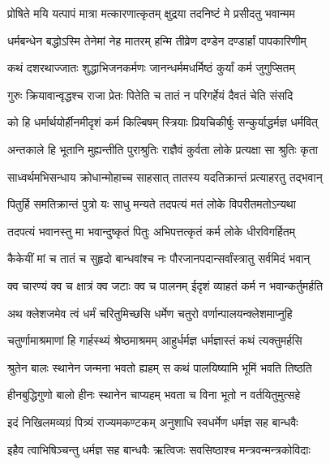 \twolineshloka
{प्रोषिते मयि यत्पापं मात्रा मत्कारणात्कृतम्}
{क्षुद्रया तदनिष्टं मे प्रसीदतु भवान्मम} %

\twolineshloka
{धर्मबन्धेन बद्धोऽस्मि तेनेमां नेह मातरम्}
{हन्मि तीव्रेण दण्डेन दण्डार्हां पापकारिणीम्} %

\twolineshloka
{कथं दशरथाज्जातः शुद्धाभिजनकर्मणः}
{जानन्धर्ममधर्मिष्ठं कुर्यां कर्म जुगुप्सितम्} %

\twolineshloka
{गुरुः क्रियावान्वृद्धश्च राजा प्रेतः पितेति च}
{तातं न परिगर्हेयं दैवतं चेति संसदि} %

\twolineshloka
{को हि धर्मार्थयोर्हीनमीदृशं कर्म किल्बिषम्}
{स्त्रियाः प्रियचिकीर्षुः सन्कुर्याद्धर्मज्ञ धर्मवित्} %

\twolineshloka
{अन्तकाले हि भूतानि मुह्यन्तीति पुराश्रुतिः}
{राज्ञैवं कुर्वता लोके प्रत्यक्षा सा श्रुतिः कृता} %

\twolineshloka
{साध्वर्थमभिसन्धाय क्रोधान्मोहाच्च साहसात्}
{तातस्य यदतिक्रान्तं प्रत्याहरतु तद्भवान्} %

\twolineshloka
{पितुर्हि समतिक्रान्तं पुत्रो यः साधु मन्यते}
{तदपत्यं मतं लोके विपरीतमतोऽन्यथा} %

\twolineshloka
{तदपत्यं भवानस्तु मा भवान्दुष्कृतं पितुः}
{अभिपत्तत्कृतं कर्म लोके धीरविगर्हितम्} %

\twolineshloka
{कैकेयीं मां च तातं च सुहृदो बान्धवांश्च नः}
{पौरजानपदान्सर्वांस्त्रातु सर्वमिदं भवान्} %

\twolineshloka
{क्व चारण्यं क्व च क्षात्रं क्व जटाः क्व च पालनम्}
{ईदृशं व्याहतं कर्म न भवान्कर्तुमर्हति} %

\twolineshloka
{अथ क्लेशजमेव त्वं धर्मं चरितुमिच्छसि}
{धर्मेण चतुरो वर्णान्पालयन्क्लेशमाप्नुहि} %

\twolineshloka
{चतुर्णामाश्रमाणां हि गार्हस्थ्यं श्रेष्ठमाश्रमम्}
{आहुर्धर्मज्ञ धर्मज्ञास्तं कथं त्यक्तुमर्हसि} %

\twolineshloka
{श्रुतेन बालः स्थानेन जन्मना भवतो ह्यहम्}
{स कथं पालयिष्यामि भूमिं भवति तिष्ठति} %

\twolineshloka
{हीनबुद्धिगुणो बालो हीनः स्थानेन चाप्यहम्}
{भवता च विना भूतो न वर्तयितुमुत्सहे} %

\twolineshloka
{इदं निखिलमव्यग्रं पित्र्यं राज्यमकण्टकम्}
{अनुशाधि स्वधर्मेण धर्मज्ञ सह बान्धवैः} %

\twolineshloka
{इहैव त्वाभिषिञ्चन्तु धर्मज्ञ सह बान्धवैः}
{ऋत्विजः सवसिष्ठाश्च मन्त्रवन्मन्त्रकोविदाः} %

